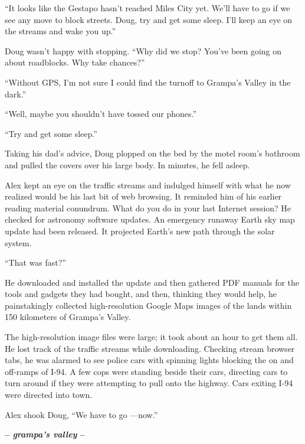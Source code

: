 ``It looks like the Gestapo hasn't reached Miles City yet. We'll have to
go if we see any move to block streets. Doug, try and get some sleep.
I'll keep an eye on the streams and wake you up.''

Doug wasn't happy with stopping. ``Why did we stop? You've been going on
about roadblocks. Why take chances?''

``Without GPS, I'm not sure I could find the turnoff to Grampa's Valley
in the dark.''

``Well, maybe you shouldn't have tossed our phones.''

``Try and get some sleep.''

Taking his dad's advice, Doug plopped on the bed by the motel room's
bathroom and pulled the covers over his large body. In minutes, he fell
asleep.

Alex kept an eye on the traffic streams and indulged himself with what
he now realized would be his last bit of web browsing. It reminded him
of his earlier reading material conundrum. What do you do in your last
Internet session? He checked for astronomy software updates. An
emergency runaway Earth sky map update had been released. It projected
Earth's new path through the solar system.

``That was fast?''

He downloaded and installed the update and then gathered PDF manuals for
the tools and gadgets they had bought, and then, thinking they would
help, he painstakingly collected high-resolution Google Maps images of
the lands within 150 kilometers of Grampa's Valley.

The high-resolution image files were large; it took about an hour to get
them all. He lost track of the traffic streams while downloading.
Checking stream browser tabs, he was alarmed to see police cars with
spinning lights blocking the on and off-ramps of I-94. A few cops were
standing beside their cars, directing cars to turn around if they were
attempting to pull onto the highway. Cars exiting I-94 were directed
into town.

Alex shook Doug, ``We have to go ---now.''

\begin{center}\large\textbf{-- \emph{grampa's valley} --}\normalsize\end{center}

